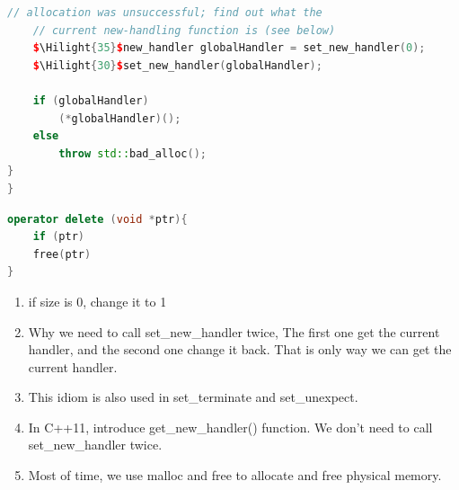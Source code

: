 \documentclass[a4paper,12pt,twoside]{book}
\newcommand{\Hilight}[1]{\makebox[0pt][l]{\color{yellow}\rule[-3pt]{#1em}{11pt}}}
\begin{document}
\begin{itemize}
\begin{lstlisting}[frame=single, language=c++]
	// allocation was unsuccessful; find out what the
	// current new-handling function is (see below)
	$\Hilight{35}$new_handler globalHandler = set_new_handler(0);
	$\Hilight{30}$set_new_handler(globalHandler);

	if (globalHandler) 
		(*globalHandler)();
	else 
		throw std::bad_alloc();
}
}
\end{lstlisting}

\begin{lstlisting}[frame=single, language=c++]
operator delete (void *ptr){
	if (ptr)
	free(ptr)
}
\end{lstlisting}
\begin{enumerate}
	\item if size is 0, change it to 1
	\item Why we need to call set\_new\_handler twice, The first one get the current handler, and the second one change it back. That is only way we can get the current handler.
	
	\item This idiom is also used in set\_terminate and set\_unexpect. 
	
	\item In C++11, introduce get\_new\_handler() function. We don't need to call set\_new\_handler twice. 

	\item Most of time, we use malloc and free to allocate and free physical memory.
\end{enumerate}
\end{itemize}
\end{document}
